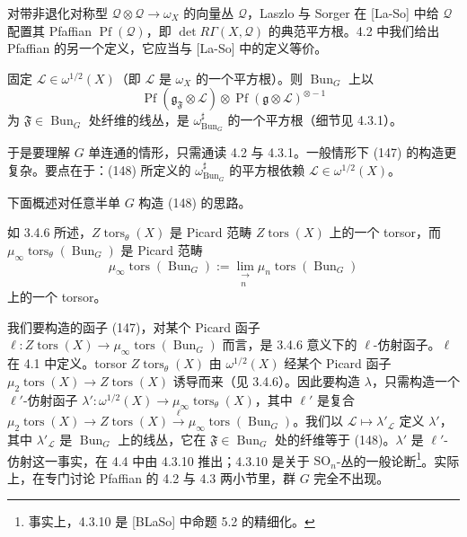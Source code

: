 对带非退化对称型 $\mathcal{Q}\otimes\mathcal{Q}\to\omega_X$ 的向量丛 $\mathcal{Q}$，Laszlo 与 Sorger 在 [La-So] 中给 $\mathcal{Q}$ 配置其 Pfaffian $\operatorname{Pf}(\mathcal{Q})$，即 $\det R\Gamma(X,\mathcal{Q})$ 的典范平方根。4.2 中我们给出 Pfaffian 的另一个定义，它应当与 [La-So] 中的定义等价。


固定 $\mathcal{L}\in\omega^{1/2}(X)$（即 $\mathcal{L}$ 是 $\omega_X$ 的一个平方根）。则 $\operatorname{Bun}_G$ 上以
\begin{equation}\tag{148}
\operatorname{Pf}(\mathfrak{g}_{\mathfrak{F}}\otimes\mathcal{L})\otimes\operatorname{Pf}(\mathfrak{g}\otimes\mathcal{L})^{\otimes -1}
\end{equation}
为 $\mathfrak{F}\in\operatorname{Bun}_G$ 处纤维的线丛，是 $\omega^{\sharp}_{\operatorname{Bun}_G}$ 的一个平方根（细节见 4.3.1）。

于是要理解 $G$ 单连通的情形，只需通读 4.2 与 4.3.1。一般情形下 (147) 的构造更复杂。要点在于：(148) 所定义的 $\omega^{\sharp}_{\operatorname{Bun}_G}$ 的平方根依赖 $\mathcal{L}\in\omega^{1/2}(X)$。

 下面概述对任意半单 $G$ 构造 (148) 的思路。

如 3.4.6 所述，$Z\operatorname{tors}_{\theta}(X)$ 是 Picard 范畴 $Z\operatorname{tors}(X)$ 上的一个 torsor，而 $\mu_\infty\operatorname{tors}_{\theta}(\operatorname{Bun}_G)$ 是 Picard 范畴
\begin{equation}\tag{149}
\mu_\infty\operatorname{tors}(\operatorname{Bun}_G):=\lim_{\substack{\longrightarrow\\ n}}\mu_n\operatorname{tors}(\operatorname{Bun}_G)
\end{equation}
上的一个 torsor。


我们要构造的函子 (147)，对某个 Picard 函子 $\ell:Z\operatorname{tors}(X)\to\mu_\infty\operatorname{tors}(\operatorname{Bun}_G)$ 而言，是 3.4.6 意义下的 $\ell$-仿射函子。$\ell$ 在 4.1 中定义。torsor $Z\operatorname{tors}_{\theta}(X)$ 由 $\omega^{1/2}(X)$ 经某个 Picard 函子 $\mu_2\operatorname{tors}(X)\to Z\operatorname{tors}(X)$ 诱导而来（见 3.4.6）。因此要构造 $\lambda$，只需构造一个 $\ell'$-仿射函子 $\lambda':\omega^{1/2}(X)\to\mu_\infty\operatorname{tors}_{\theta}(X)$，其中 $\ell'$ 是复合 $\mu_2\operatorname{tors}(X)\to Z\operatorname{tors}(X)\xrightarrow{\ \ell\ }\mu_\infty\operatorname{tors}(\operatorname{Bun}_G)$。我们以 $\mathcal{L}\mapsto\lambda'_{\mathcal{L}}$ 定义 $\lambda'$，其中 $\lambda'_{\mathcal{L}}$ 是 $\operatorname{Bun}_G$ 上的线丛，它在 $\mathfrak{F}\in\operatorname{Bun}_G$ 处的纤维等于 (148)。$\lambda'$ 是 $\ell'$-仿射这一事实，在 4.4 中由 4.3.10 推出；4.3.10 是关于 $\mathrm{SO}_n$-丛的一般论断\footnote{事实上，4.3.10 是 [BLaSo] 中命题 5.2 的精细化。}。实际上，在专门讨论 Pfaffian 的 4.2 与 4.3 两小节里，群 $G$ 完全不出现。

